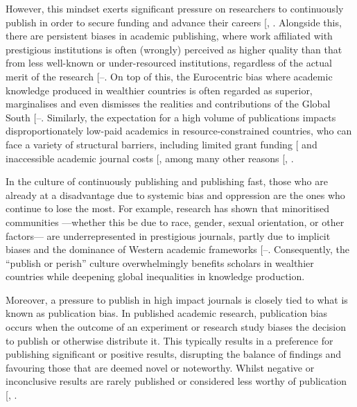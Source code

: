 \documentclass[
  11pt,
  letterpaper,
]{scrreprt}
\begin{document}
However, this mindset exerts significant pressure on researchers to
continuously publish in order to secure funding and advance their
careers {[},
\citeproc{ref-hangel2017Why}{309}{]}. Alongside this, there are
persistent biases in academic publishing, where work affiliated with
prestigious institutions is often (wrongly) perceived as higher quality
than that from less well-known or under-resourced institutions,
regardless of the actual merit of the research
{[}--\citeproc{ref-campbell2019Prestige}{312}{]}.
On top of this, the Eurocentric bias where academic knowledge produced
in wealthier countries is often regarded as superior, marginalises and
even dismisses the realities and contributions of the Global South
{[}--\citeproc{ref-amutuhaire2022Reality}{316}{]}.
Similarly, the expectation for a high volume of publications impacts
disproportionately low-paid academics in resource-constrained countries,
who can face a variety of structural barriers, including limited grant
funding {[}\citeproc{ref-castrotorres2022North}{315}{]} and inaccessible
academic journal costs {[},
\citeproc{ref-collyer2018Global}{318}{]} among many other reasons
{[},
\citeproc{ref-willis2021Gender}{320}{]}.

In the culture of continuously publishing and publishing fast, those who
are already at a disadvantage due to systemic bias and oppression are
the ones who continue to lose the most. For example, research has shown
that minoritised communities ---whether this be due to race, gender,
sexual orientation, or other factors--- are underrepresented in
prestigious journals, partly due to implicit biases and the dominance of
Western academic frameworks
{[}--\citeproc{ref-boda2022What}{321}{]}.
Consequently, the ``publish or perish'' culture overwhelmingly benefits
scholars in wealthier countries while deepening global inequalities in
knowledge production.

Moreover, a pressure to publish in high impact journals is closely tied
to what is known as publication bias. In published academic research,
publication bias occurs when the outcome of an experiment or research
study biases the decision to publish or otherwise distribute it. This
typically results in a preference for publishing significant or positive
results, disrupting the balance of findings and favouring those that are
deemed novel or noteworthy. Whilst negative or inconclusive results are
rarely published or considered less worthy of publication
{[},
\citeproc{ref-page2021Investigating}{323}{]}.
\end{document}
